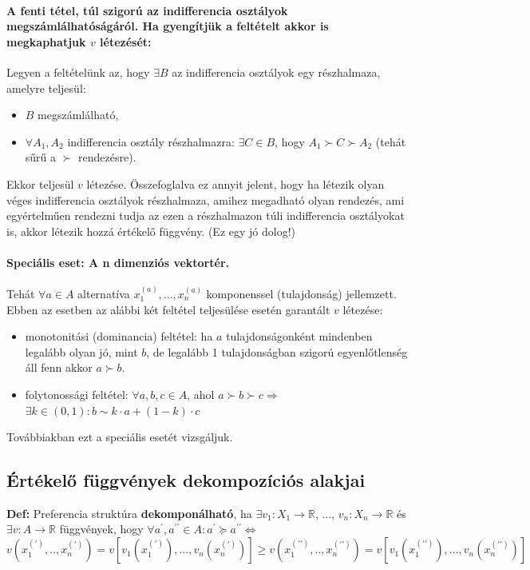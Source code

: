 \documentclass[a4paper,12pt]{article}
\begin{document}
\paragraph{A fenti tétel, túl szigorú az indifferencia osztályok megszámlálhatóságáról. Ha gyengítjük a feltételt akkor is megkaphatjuk $v$ létezését: }

Legyen a feltételünk az, hogy $\exists B$ az indifferencia osztályok egy részhalmaza, amelyre teljesül:
\begin{itemize}
\item $B$ megszámlálható,
\item $\forall A_1, A_2$ indifferencia osztály részhalmazra: $\exists C \in B$, hogy $A_1 \succ C \succ A_2$ (tehát sűrű a $\succ$ rendezésre). 
\end{itemize}
Ekkor teljesül $v$ létezése. Összefoglalva ez annyit jelent, hogy ha létezik olyan véges indifferencia osztályok részhalmaza, amihez megadható olyan rendezés, ami egyértelműen rendezni tudja az ezen a részhalmazon túli indifferencia osztályokat is, akkor létezik hozzá értékelő függvény. (Ez egy jó dolog!)

\paragraph{Speciális eset: A n dimenziós vektortér. } Tehát $\forall a \in A$ alternatíva $x^{(a)}_1, ... , x^{(a)}_n$ komponenssel (tulajdonság) jellemzett. Ebben az esetben az alábbi két feltétel teljesülése esetén garantált $v$ létezése: 

\begin{itemize}
\item monotonitási (dominancia) feltétel: ha $a$ tulajdonságonként mindenben legalább olyan jó, mint $b$, de legalább 1 tulajdonságban szigorú egyenlőtlenség áll fenn akkor $a \succ b$.
\item folytonossági feltétel: $\forall a,b,c \in A$, ahol $a \succ b \succ c \Rightarrow$  $\exists k \in (0,1): b \sim k \cdot a + (1-k) \cdot c$
\end{itemize}
Továbbiakban ezt a speciális esetét vizsgáljuk.

\subsection{Értékelő függvények dekompozíciós alakjai}

\textbf{Def: } Preferencia struktúra \textbf{dekomponálható}, ha $\exists v_1: X_1 \rightarrow \mathbb{R}$, ..., $v_n: X_n \rightarrow \mathbb{R}$ és $\exists v: A \rightarrow \mathbb{R}$ függvények, hogy $\forall a^\prime, a^{\prime\prime} \in A: a^\prime  \succeq  a^{\prime\prime} \Leftrightarrow $
\begin{equation}
v(x^{(\prime)}_1, .., x^{(\prime)}_n)=v[v_1(x^{(\prime)}_1), ..., v_n(x^{(\prime)}_n)] \geq v(x^{(\prime\prime)}_1, .., x^{(\prime\prime)}_n)=v[v_1(x^{(\prime\prime)}_1), ..., v_n(x^{(\prime\prime)}_n)]
\end{equation}
\end{document}
